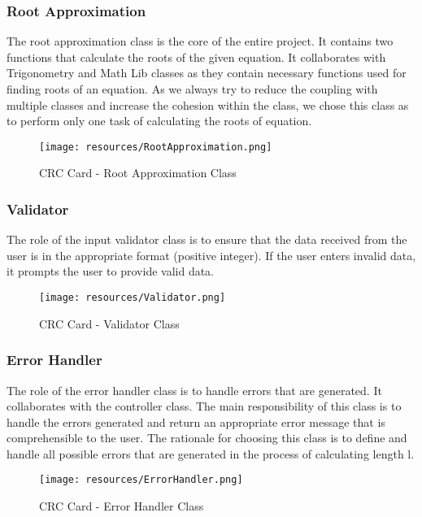     \subsubsection{Root Approximation}
      \parbox{1.0\linewidth}{
        The root approximation class is the core of the entire project. It contains two functions that calculate the roots of the given equation. It collaborates with Trigonometry and Math Lib classes as they contain necessary functions used for finding roots of an equation. As we always try to reduce the coupling with multiple classes and increase the cohesion within the class, we chose this class as to perform only one task of calculating the roots of equation.
      }
      \vspace*{2em}
      \begin{figure}[h!]
        \centering
        \texttt{[image: resources/RootApproximation.png]}
        \caption{CRC Card - Root Approximation Class}\label{fig:rootapprox}
      \end{figure} 

    \subsubsection{Validator}
      \parbox{1.0\linewidth}{
        The role of the input validator class is to ensure that the data received from the user is in the appropriate format (positive integer). If the user enters invalid data, it prompts the user to provide valid data.
      }
      \vspace*{2em}
      \begin{figure}[h!]
        \centering
        \texttt{[image: resources/Validator.png]}
        \caption{CRC Card - Validator Class}\label{fig:validator}
      \end{figure}  

    \subsubsection{Error Handler}
      \parbox{1.0\linewidth}{
        The role of the error handler class is to handle errors that are generated. It collaborates with the controller class. The main responsibility of this class is to handle the errors generated and return an appropriate error message that is comprehensible to the user. The rationale for choosing this class is to define and handle all possible errors that are generated in the process of calculating length l.
      }
      \vspace*{2em}
      \begin{figure}[h!]
        \centering
        \texttt{[image: resources/ErrorHandler.png]}
        \caption{CRC Card - Error Handler Class}\label{fig:error}
      \end{figure}

